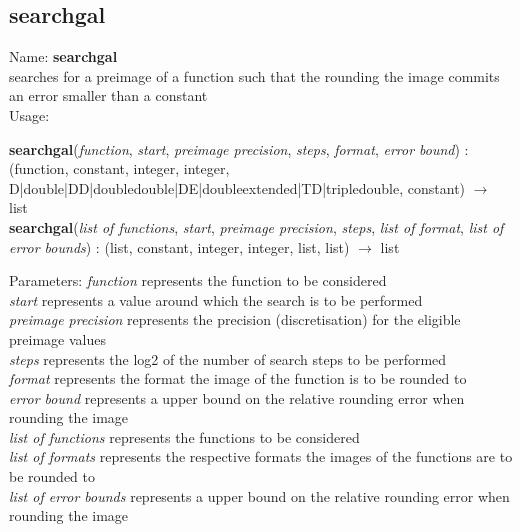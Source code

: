 \subsection{ searchgal }
\noindent Name: \textbf{searchgal}\\
searches for a preimage of a function such that the rounding the image commits an error smaller than a constant\\

\noindent Usage: 
\begin{center}
\textbf{searchgal}(\emph{function}, \emph{start}, \emph{preimage precision}, \emph{steps}, \emph{format}, \emph{error bound}) : (\textsf{function}, \textsf{constant}, \textsf{integer}, \textsf{integer}, \textsf{D|double|DD|doubledouble|DE|doubleextended|TD|tripledouble}, \textsf{constant}) $\rightarrow$ \textsf{list}\\
\textbf{searchgal}(\emph{list of functions}, \emph{start}, \emph{preimage precision}, \emph{steps}, \emph{list of format}, \emph{list of error bounds}) : (\textsf{list}, \textsf{constant}, \textsf{integer}, \textsf{integer}, \textsf{list}, \textsf{list}) $\rightarrow$ \textsf{list}\\
\end{center}
Parameters: 
\emph{function} represents the function to be considered\\
\emph{start} represents a value around which the search is to be performed\\
\emph{preimage precision} represents the precision (discretisation) for the eligible preimage values\\
\emph{steps} represents the log2 of the number of search steps to be performed\\
\emph{format} represents the format the image of the function is to be rounded to\\
\emph{error bound} represents a upper bound on the relative rounding error when rounding the image\\
\emph{list of functions} represents the functions to be considered\\
\emph{list of formats} represents the respective formats the images of the functions are to be rounded to\\
\emph{list of error bounds} represents a upper bound on the relative rounding error when rounding the image\\

